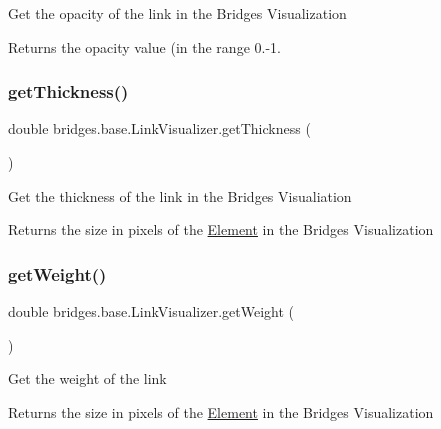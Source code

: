 Get the opacity of the link in the Bridges Visualization \begin{DoxyReturn}{Returns}
the opacity value (in the range 0.-\/1. 
\end{DoxyReturn}
\hypertarget{classbridges_1_1base_1_1_link_visualizer_af1592d2a8664b00c1a51fdc0f8d1860a}{}\label{classbridges_1_1base_1_1_link_visualizer_af1592d2a8664b00c1a51fdc0f8d1860a} 
\subsubsection{\texorpdfstring{get\+Thickness()}{getThickness()}}
{\footnotesize\ttfamily double bridges.\+base.\+Link\+Visualizer.\+get\+Thickness (\begin{DoxyParamCaption}{ }\end{DoxyParamCaption})}

Get the thickness of the link in the Bridges Visualiation

\begin{DoxyReturn}{Returns}
the size in pixels of the \hyperlink{classbridges_1_1base_1_1_element}{Element} in the Bridges Visualization 
\end{DoxyReturn}
\hypertarget{classbridges_1_1base_1_1_link_visualizer_ac96d7fb118ae6c7e1bdd57c5e2c8639a}{}\label{classbridges_1_1base_1_1_link_visualizer_ac96d7fb118ae6c7e1bdd57c5e2c8639a} 
\subsubsection{\texorpdfstring{get\+Weight()}{getWeight()}}
{\footnotesize\ttfamily double bridges.\+base.\+Link\+Visualizer.\+get\+Weight (\begin{DoxyParamCaption}{ }\end{DoxyParamCaption})}

Get the weight of the link

\begin{DoxyReturn}{Returns}
the size in pixels of the \hyperlink{classbridges_1_1base_1_1_element}{Element} in the Bridges Visualization 
\end{DoxyReturn}
\hypertarget{classbridges_1_1base_1_1_link_visualizer_a92f306dbd73b961befa8ab4c0620a89e}{}\label{classbridges_1_1base_1_1_link_visualizer_a92f306dbd73b961befa8ab4c0620a89e} 
